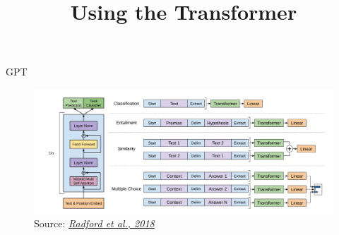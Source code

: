 



\newcommand{\titlefigure}{figure/gpt_sq.png}
\newcommand{\learninggoals}{
\item Understand inner workings of BPE
\item Being able to compare BPE to other tokenization approaches}

\title{Using the Transformer}
\date{}




\begin{vbframe}{GPT \href{https://s3-us-west-2.amazonaws.com/openai-assets/research-covers/language-unsupervised/language_understanding_paper.pdf}{}}

\vfill

	\begin{figure}
		\centering
		\includegraphics[width = 12cm]{figure/gpt}\\ 
		\footnotesize{Source:} \href{https://s3-us-west-2.amazonaws.com/openai-assets/research-covers/language-unsupervised/language_understanding_paper.pdf}{\footnotesize \it Radford et al., 2018}
	\end{figure}

\vfill

\end{vbframe}


